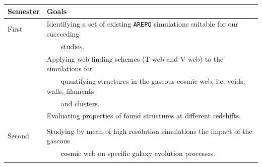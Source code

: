 \documentclass[a4,useAMS,usenatbib,usegraphicx,12pt]{article}
\begin{document}
\begin{table}[h]
\begin{flushleft}
\begin{center}
  \begin{tabular}{l  l} \hline\hline
	\centering\textbf{Semester} & \textbf{Goals} \\ \hline
	First  
	& \tabitem Identifying a set of existing \texttt{AREPO} simulations suitable 
	for our succeeding \\
	& \ \ \ \ studies. \\
	& \tabitem Applying web finding schemes (T-web and V-web) to the simulations 
	for\\
	& \ \ \ \ quantifying structures in the gaseous cosmic web, i.e. voids, walls, 
	filaments\\
	& \ \ \ \ and clusters.\\
	& \tabitem Evaluating properties of found structures at different redshifts.\\
	\\
	Second
	& \tabitem Studying by mean of high resolution simulations the impact of the 
	gaseous\\
	& \ \ \ \ cosmic web on specific galaxy evolution processes.\\
	\\	
	
	\hline\hline
  \end{tabular}  
\end{center}
\end{flushleft}
\end{table}


\newpage

\renewcommand{\bibname}{8\ \ \ \ Bibliography}
\small

\end{document}
